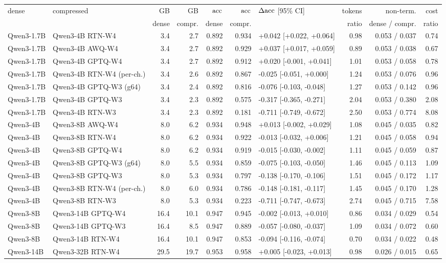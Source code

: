 \begin{tabular}{llrrrrlrrr}
\toprule
dense & compressed & GB & GB & $\mathrm{acc}$ & $\mathrm{acc}$ & $\Delta\mathrm{acc}$ [95\% CI] & tokens & non-term. & cost \\
 & & dense & compr. & dense & compr. & & ratio & dense / compr. & ratio \\
\midrule
Qwen3-1.7B & Qwen3-4B RTN-W4 & 3.4 & 2.7 & 0.892 & 0.934 & +0.042 [+0.022, +0.064] & 0.98 & 0.053 / 0.037 & 0.74 \\
Qwen3-1.7B & Qwen3-4B AWQ-W4 & 3.4 & 2.7 & 0.892 & 0.929 & +0.037 [+0.017, +0.059] & 0.89 & 0.053 / 0.038 & 0.67 \\
Qwen3-1.7B & Qwen3-4B GPTQ-W4 & 3.4 & 2.7 & 0.892 & 0.912 & +0.020 [-0.001, +0.041] & 1.01 & 0.053 / 0.058 & 0.78 \\
Qwen3-1.7B & Qwen3-4B RTN-W4 (per-ch.) & 3.4 & 2.6 & 0.892 & 0.867 & -0.025 [-0.051, +0.000] & 1.24 & 0.053 / 0.076 & 0.96 \\
Qwen3-1.7B & Qwen3-4B GPTQ-W3 (g64) & 3.4 & 2.4 & 0.892 & 0.816 & -0.076 [-0.103, -0.048] & 1.27 & 0.053 / 0.142 & 0.96 \\
Qwen3-1.7B & Qwen3-4B GPTQ-W3 & 3.4 & 2.3 & 0.892 & 0.575 & -0.317 [-0.365, -0.271] & 2.04 & 0.053 / 0.380 & 2.08 \\
Qwen3-1.7B & Qwen3-4B RTN-W3 & 3.4 & 2.3 & 0.892 & 0.181 & -0.711 [-0.749, -0.672] & 2.50 & 0.053 / 0.774 & 8.08 \\
Qwen3-4B & Qwen3-8B AWQ-W4 & 8.0 & 6.2 & 0.934 & 0.948 & +0.013 [-0.002, +0.029] & 1.08 & 0.045 / 0.035 & 0.82 \\
Qwen3-4B & Qwen3-8B RTN-W4 & 8.0 & 6.2 & 0.934 & 0.922 & -0.013 [-0.032, +0.006] & 1.21 & 0.045 / 0.058 & 0.94 \\
Qwen3-4B & Qwen3-8B GPTQ-W4 & 8.0 & 6.2 & 0.934 & 0.919 & -0.015 [-0.030, -0.002] & 1.11 & 0.045 / 0.059 & 0.87 \\
Qwen3-4B & Qwen3-8B GPTQ-W3 (g64) & 8.0 & 5.5 & 0.934 & 0.859 & -0.075 [-0.103, -0.050] & 1.46 & 0.045 / 0.113 & 1.09 \\
Qwen3-4B & Qwen3-8B GPTQ-W3 & 8.0 & 5.3 & 0.934 & 0.797 & -0.138 [-0.170, -0.106] & 1.51 & 0.045 / 0.172 & 1.17 \\
Qwen3-4B & Qwen3-8B RTN-W4 (per-ch.) & 8.0 & 6.0 & 0.934 & 0.786 & -0.148 [-0.181, -0.117] & 1.45 & 0.045 / 0.170 & 1.28 \\
Qwen3-4B & Qwen3-8B RTN-W3 & 8.0 & 5.3 & 0.934 & 0.223 & -0.711 [-0.747, -0.673] & 2.74 & 0.045 / 0.715 & 7.58 \\
Qwen3-8B & Qwen3-14B GPTQ-W4 & 16.4 & 10.1 & 0.947 & 0.945 & -0.002 [-0.013, +0.010] & 0.86 & 0.034 / 0.029 & 0.54 \\
Qwen3-8B & Qwen3-14B GPTQ-W3 & 16.4 & 8.5 & 0.947 & 0.889 & -0.057 [-0.080, -0.037] & 1.09 & 0.034 / 0.072 & 0.60 \\
Qwen3-8B & Qwen3-14B RTN-W4 & 16.4 & 10.1 & 0.947 & 0.853 & -0.094 [-0.116, -0.074] & 0.70 & 0.034 / 0.022 & 0.48 \\
Qwen3-14B & Qwen3-32B RTN-W4 & 29.5 & 19.7 & 0.953 & 0.958 & +0.005 [-0.023, +0.013] & 0.98 & 0.026 / 0.015 & 0.65 \\
\bottomrule
\end{tabular}
